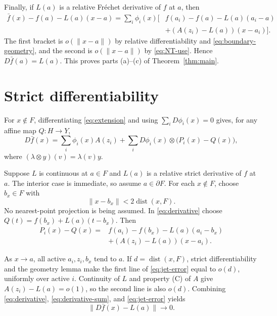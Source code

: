 \documentclass[11pt]{article}
\newcommand{\dist}{\operatorname{dist}}
\begin{document}
Finally, if $L(a)$ is a relative Fr\'echet derivative of $f$ at $a$, then
\begin{align*}
 \bar f(x)-f(a)-L(a)(x-a)
 =\sum_i\phi_i(x)\bigl[&f(a_i)-f(a)-L(a)(a_i-a)\\
 &+(A(z_i)-L(a))(x-a_i)\bigr].
\end{align*}
The first bracket is $o(\|x-a\|)$ by relative differentiability and
\eqref{eq:boundary-geometry}, and the second is $o(\|x-a\|)$ by
\eqref{eq:NT-use}.  Hence
$D\bar f(a)=L(a)$.  This proves parts (a)--(c) of
Theorem~\ref{thm:main}.

\section{Strict differentiability}

For $x\notin F$, differentiating \eqref{eq:extension} and using
$\sum_iD\phi_i(x)=0$ gives, for any affine map $Q:H\to Y$,
\begin{equation}
 D\bar f(x)=\sum_i\phi_i(x)A(z_i)
 +\sum_i D\phi_i(x)\otimes\bigl(P_i(x)-Q(x)\bigr),
 \label{eq:derivative}
\end{equation}
where $(\lambda\otimes y)(v)=\lambda(v)y$.

Suppose $L$ is continuous at $a\in F$ and $L(a)$ is a relative strict
derivative of $f$ at $a$.  The interior case is immediate, so assume
$a\in\partial F$.  For each $x\notin F$, choose $b_x\in F$ with
\begin{equation}
 \|x-b_x\|<2\dist(x,F).
 \label{eq:approx-nearest}
\end{equation}
No nearest-point projection is being assumed.  In
\eqref{eq:derivative} choose
$Q(t)=f(b_x)+L(a)(t-b_x)$.  Then
\begin{align}
 P_i(x)-Q(x)
 ={}&f(a_i)-f(b_x)-L(a)(a_i-b_x)\nonumber\\
 &+(A(z_i)-L(a))(x-a_i).
 \label{eq:jet-error}
\end{align}

As $x\to a$, all active $a_i,z_i,b_x$ tend to $a$.  If
$d=\dist(x,F)$, strict differentiability and the geometry lemma make the first
line of \eqref{eq:jet-error} equal to $o(d)$, uniformly over active $i$.
Continuity of $L$ and property (C) of $A$ give
$A(z_i)-L(a)=o(1)$, so the second line is also $o(d)$.  Combining
\eqref{eq:derivative}, \eqref{eq:derivative-sum}, and
\eqref{eq:jet-error} yields
\begin{equation}
 \|D\bar f(x)-L(a)\|\longrightarrow0.
 \label{eq:D-convergence}
\end{equation}
\end{document}
